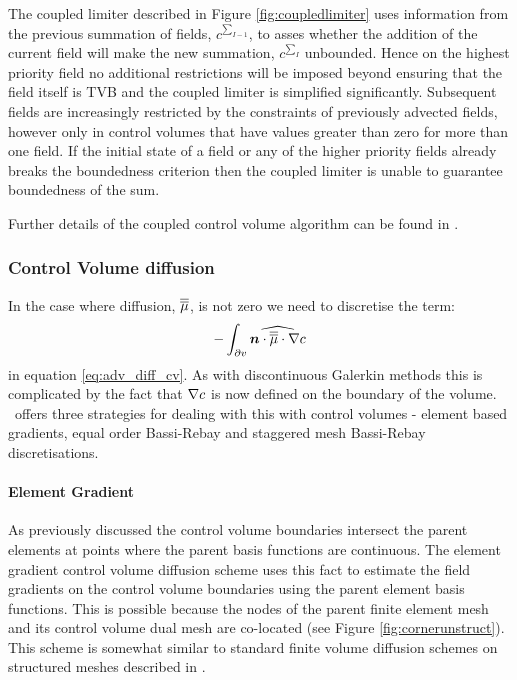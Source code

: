 The coupled limiter described in Figure \ref{fig:coupledlimiter} uses information from the previous summation of fields, $c^{\sum_{I-1}}$, to asses whether the addition of the current field will make the new summation, $c^{\sum_I}$ unbounded.  Hence on the highest priority field no additional restrictions will be imposed beyond ensuring that the field itself is TVB and the coupled limiter is simplified significantly.  Subsequent fields are increasingly restricted by the constraints of previously advected fields, however only in control volumes that have values greater than zero for more than one field.  If the initial state of a field or any of the higher priority fields already breaks the boundedness criterion then the coupled limiter is unable to guarantee boundedness of the sum.

Further details of the coupled control volume algorithm can be found in \citet{wilson_phdthesis_2009}.

\subsubsection{Control Volume diffusion}

In the case where diffusion, $\overline{\overline{\mu}}$, is not zero we need to discretise the term:
\begin{equation}
-\int_{\partial v}\widehat{{\mbox{\boldmath$n$}}\cdot\overline{\overline{\mu}}\cdot\nabla c}
\end{equation}
in equation \ref{eq:adv_diff_cv}.  As with discontinuous Galerkin methods this is complicated by the fact that $\nabla c$ is now defined on the boundary of the volume.  \fluidity\ offers three strategies for dealing with this with control volumes - element based gradients, equal order Bassi-Rebay and staggered mesh Bassi-Rebay discretisations.

\paragraph{Element Gradient} \label{sec:cvegdiff}

As previously discussed the control volume boundaries intersect the parent elements at points where the parent basis functions are continuous.  The element gradient control volume diffusion scheme uses this fact to estimate the field gradients on the control volume boundaries using the parent element basis functions.  This is possible because the nodes of the parent finite element mesh and its control volume dual mesh are co-located (see Figure \ref{fig:cornerunstruct}).  This scheme is somewhat similar to standard finite volume diffusion schemes on structured meshes described in \citet{ciarlet_handbook_2000}.

